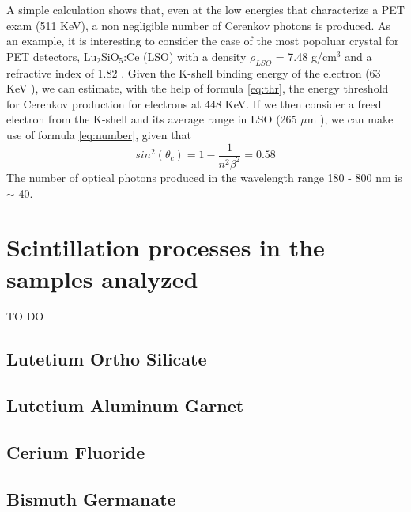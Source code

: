 A simple calculation shows that, even at the low energies that characterize a PET exam (511 KeV), a non negligible number of Cerenkov photons is produced.
As an example, it is interesting to consider the case of the most popoluar crystal for PET detectors, Lu$_{2}$SiO$_{5}$:Ce (LSO) with a density $\rho _{LSO}$ = 7.48 g/cm$^{3}$ and a refractive index of 1.82 \cite{jellison2012}.
Given the K-shell binding energy of the electron (63 KeV \cite{xdata2009}), we can estimate, with the help of formula  \ref{eq:thr}, the energy threshold for Cerenkov production for electrons at 448 KeV.
If we then consider a freed electron from the K-shell and its average range in LSO (265 $\mu$m \cite{nist2005}), we can make use of formula \ref{eq:number}, given that
\begin{equation}
sin ^{2}(\theta _{c}) = 1 - \frac{1}{n^{2}\beta ^{2}} = 0.58
\end{equation}
The number of optical photons produced in the wavelength range 180 - 800 nm is $\sim$ 40.


\section{Scintillation processes in the samples analyzed}
TO DO

\subsection{Lutetium Ortho Silicate}

\subsection{Lutetium Aluminum Garnet}

\subsection{Cerium Fluoride}

\subsection{Bismuth Germanate}